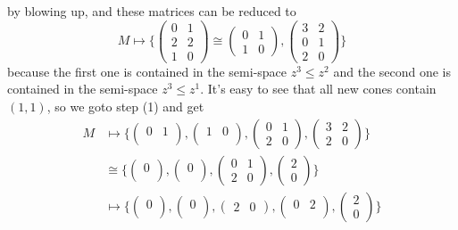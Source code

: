 \documentclass[12pt]{article}
\theoremstyle{definition}
\theoremstyle{plain}
\begin{document}
by blowing up, and these matrices can be reduced to
\[
	M\mapsto \biggl\{
		\begin{pmatrix}
			0&1\\
			2&2\\
			1&0
		\end{pmatrix}\cong
		\begin{pmatrix}
			0&1\\
			1&0
		\end{pmatrix},
		\begin{pmatrix}
			3&2\\
			0&1\\
			2&0
		\end{pmatrix}
	\biggr\}
\]
because the first one is contained in the semi-space $z^3\leq z^2$
and the second one is contained in the semi-space $z^3\leq z^1$.
It's easy to see that all new cones contain $(1,1)$, so we goto step (1) 
and get
\begin{align*}
	M&\mapsto 
	\biggl\{
		\begin{pmatrix}
			0&1\\
		\end{pmatrix},
		\begin{pmatrix}
			1&0\\
		\end{pmatrix},
		\begin{pmatrix}
			0&1\\
			2&0
		\end{pmatrix},
		\begin{pmatrix}
			3&2\\
			2&0
		\end{pmatrix}
	\biggr\}\\
	 &\cong
	 \biggl\{
		 \begin{pmatrix}
			 0\\
		 \end{pmatrix},
		 \begin{pmatrix}
			 0\\
		 \end{pmatrix},
		 \begin{pmatrix}
			 0&1\\
			 2&0
		 \end{pmatrix},
		 \begin{pmatrix}
			 2\\
			 0
		 \end{pmatrix}
	 \biggr\}\\
	 &\mapsto
	 \biggl\{
		 \begin{pmatrix}
			 0\\
		 \end{pmatrix},
		 \begin{pmatrix}
			 0\\
		 \end{pmatrix},
		 \begin{pmatrix}
			 2&0
		 \end{pmatrix},
		 \begin{pmatrix}
			 0&2\\
		 \end{pmatrix},
		 \begin{pmatrix}
			 2\\
			 0
		 \end{pmatrix}
	 \biggr\}
\end{align*}
\end{document}
